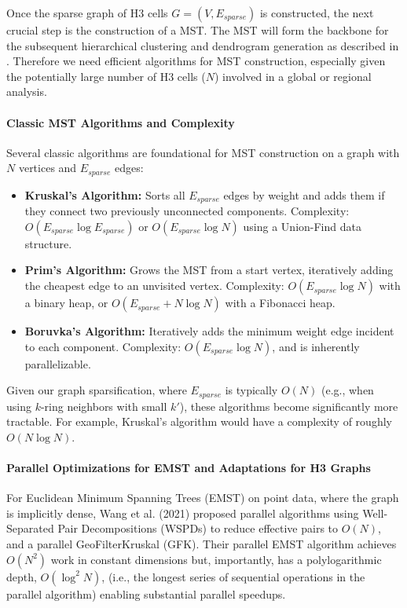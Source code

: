 Once the sparse graph of H3 cells $G=(V, E_{sparse})$ is constructed, the next crucial step is the construction of a MST. 
The MST will form the backbone for the subsequent hierarchical clustering and dendrogram generation as described in \cite{Wang_Yu_Gu_Shun_2021}. 
Therefore we need efficient algorithms for MST construction, especially given the potentially large number of H3 cells ($N$) involved in a global or regional analysis.

\paragraph{Classic MST Algorithms and Complexity}
Several classic algorithms are foundational for MST construction on a graph with $N$ vertices and $E_{sparse}$ edges:
\begin{itemize}
    \item \textbf{Kruskal's Algorithm:} Sorts all $E_{sparse}$ edges by weight and adds them if they connect two previously unconnected components. Complexity: $O(E_{sparse} \log E_{sparse})$ or $O(E_{sparse} \log N)$ using a Union-Find data structure.
    \item \textbf{Prim's Algorithm:} Grows the MST from a start vertex, iteratively adding the cheapest edge to an unvisited vertex. Complexity: $O(E_{sparse} \log N)$ with a binary heap, or $O(E_{sparse} + N \log N)$ with a Fibonacci heap.
    \item \textbf{Boruvka's Algorithm:} Iteratively adds the minimum weight edge incident to each component. Complexity: $O(E_{sparse} \log N)$, and is inherently parallelizable.
\end{itemize}
Given our graph sparsification, where $E_{sparse}$ is typically $O(N)$ (e.g., when using $k$-ring neighbors with small $k'$), these algorithms become significantly more tractable. For example, Kruskal's algorithm would have a complexity of roughly $O(N \log N)$.

\paragraph{Parallel Optimizations for EMST and Adaptations for H3 Graphs}
For Euclidean Minimum Spanning Trees (EMST) on point data, where the graph is implicitly dense, Wang et al. (2021) proposed parallel algorithms using Well-Separated Pair Decompositions (WSPDs) to reduce effective pairs to $O(N)$, and a parallel GeoFilterKruskal (GFK)\cite{Wang_Fast_Parallel_EMST_HDBSCAN_2021}. 
Their parallel EMST algorithm achieves $O(N^2)$ work in constant dimensions but, importantly, has a polylogarithmic depth, $O(\log^2 N)$, (i.e., the longest series of sequential operations in the parallel algorithm) enabling substantial parallel speedups. 

